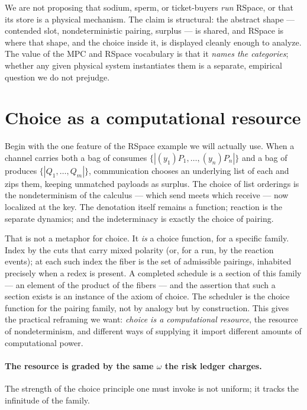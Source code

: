 \begin{remark}
We are not proposing that sodium, sperm, or ticket-buyers \emph{run} RSpace, or that
its store is a physical mechanism. The claim is structural: the abstract shape ---
contended slot, nondeterministic pairing, surplus --- is shared, and RSpace is where
that shape, and the choice inside it, is displayed cleanly enough to analyze. The
value of the MPC and RSpace vocabulary is that it \emph{names the categories};
whether any given physical system instantiates them is a separate, empirical
question we do not prejudge.
\end{remark}


\section{Choice as a computational resource}\label{ndo:sec:choice}

Begin with the one feature of the RSpace example we will actually use. When a
channel carries both a bag of consumes $\{\!|(y_1)P_1,\dots,(y_n)P_n|\!\}$ and a
bag of produces $\{\!|Q_1,\dots,Q_m|\!\}$, communication chooses an underlying
list of each and zips them, keeping unmatched payloads as surplus. The choice of
list orderings is the nondeterminism of the calculus --- which send meets which
receive --- now localized at the key. The denotation itself remains a function;
reaction is the separate dynamics; and the indeterminacy is exactly the choice of
pairing.

That is not a metaphor for choice. It \emph{is} a choice function, for a specific
family. Index by the cuts that carry mixed polarity (or, for a run, by the
reaction events); at each such index the fiber is the set of admissible pairings,
inhabited precisely when a redex is present. A completed schedule is a section of
this family --- an element of the product of the fibers --- and the assertion that
such a section exists is an instance of the axiom of choice. The scheduler is the
choice function for the pairing family, not by analogy but by construction. This
gives the practical reframing we want: \emph{choice is a computational resource},
the resource of nondeterminism, and different ways of supplying it import
different amounts of computational power.

\paragraph{The resource is graded by the same $\omega$ the risk ledger charges.}
The strength of the choice principle one must invoke is not uniform; it tracks
the infinitude of the family.

